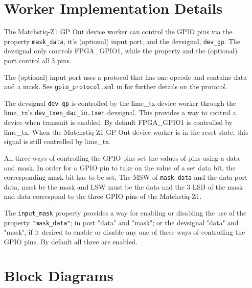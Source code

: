 \documentclass{article}
\begin{document}
\section*{Worker Implementation Details}
\begin{flushleft}

The Matchstiq-Z1 GP Out device worker can control the GPIO pins via the property \texttt{mask\_data}, it's (optional) input port, and the devsignal, \texttt{dev\_gp}. The devsignal only controls FPGA\_GPIO1, while the property and the (optional) port control all 3 pins. \newline

The (optional) input port uses a protocol that has one opcode and contains data and a mask. See \texttt{gpio\_protocol.xml} in   for further details on the protocol. \newline

The devsignal \texttt{dev\_gp} is controlled by the lime\_tx device worker through the lime\_tx's \texttt{dev\_txen\_dac\_in.txen} devsignal. This provides a way to control a device when transmit is enabled. By default FPGA\_GPIO1 is controlled by lime\_tx. When the Matchstiq-Z1 GP Out device worker is in the reset state, this signal is still controlled by lime\_tx. \newline

All three ways of controlling the GPIO pins set the values of pins using a data and mask. In order for a GPIO pin to take on the value of a set data bit, the corresponding mask bit has to be set. The MSW of \texttt{mask\_data} and the data port data, must be the mask and LSW must be the data and the 3 LSB of the mask and data correspond to the three GPIO pins of the Matchstiq-Z1. \newline

The \texttt{input\_mask} property provides a way for enabling or disabling the use of the property \texttt{"mask\_data"}; in port "data" and "mask"; or the devsignal "data" and "mask", if it desired to enable or disable any one of these ways of controlling the GPIO pins. By default all three are enabled.

\end{flushleft}


\section*{Block Diagrams}
\end{document}
